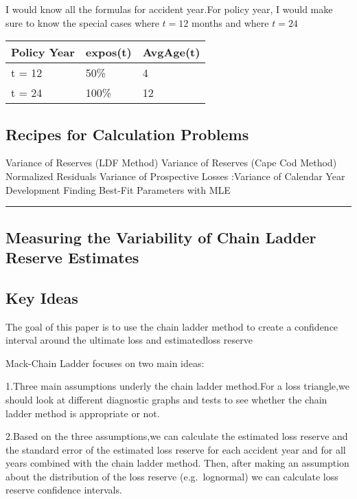 \documentclass[
]{article}
\begin{document}
I would know all the formulas for accident year.For policy year, I would
make sure to know the special cases where \(t=12\) months and where
\(t=24\)

\begin{longtable}[]{@{}lll@{}}
\toprule\noalign{}
Policy Year & expos(t) & AvgAge(t) \\
\midrule\noalign{}
\endhead
\bottomrule\noalign{}
\endlastfoot
t = 12 & 50\% & 4 \\
t = 24 & 100\% & 12 \\
\end{longtable}

\subsection{Recipes for Calculation
Problems}\label{recipes-for-calculation-problems-3}

Variance of Reserves (LDF Method) Variance of Reserves (Cape Cod Method)
Normalized Residuals Variance of Prospective Losses :Variance of
Calendar Year Development Finding Best-Fit Parameters with MLE

\begin{center}\rule{0.5\linewidth}{0.5pt}\end{center}

\subsection{Measuring the Variability of Chain Ladder Reserve
Estimates}\label{measuring-the-variability-of-chain-ladder-reserve-estimates}

\subsection{Key Ideas}\label{key-ideas}

The goal of this paper is to use the chain ladder method to create a
confidence interval around the ultimate loss and estimatedloss reserve

Mack-Chain Ladder focuses on two main ideas:

1.Three main assumptions underly the chain ladder method.For a loss
triangle,we should look at different diagnostic graphs and tests to see
whether the chain ladder method is appropriate or not.

2.Based on the three assumptions,we can calculate the estimated loss
reserve and the standard error of the estimated loss reserve for each
accident year and for all years combined with the chain ladder method.
Then, after making an assumption about the distribution of the loss
reserve (e.g.~lognormal) we can calculate loss reserve confidence
intervals.
\end{document}
